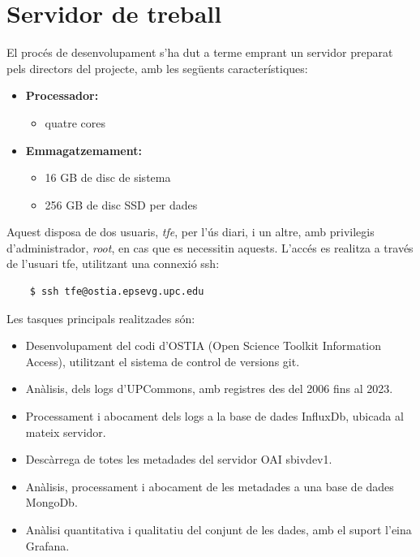 \chapter{Servidor de treball}\label{ch:server-description}

El procés de desenvolupament s’ha dut a terme emprant un servidor preparat pels directors del projecte, amb les següents característiques:

\begin{itemize}
    \item \textbf{Processador:}
    \begin{itemize}
        \item quatre cores
    \end{itemize}
    \item \textbf{Emmagatzemament:}
    \begin{itemize}
        \item 16 GB de disc de sistema
        \item 256 GB de disc SSD per dades
    \end{itemize}
\end{itemize}

\noindent
Aquest disposa de dos usuaris, \textit{tfe}, per l’ús diari, i un altre, amb privilegis d’administrador, \textit{root}, en cas que es necessitin aquests.
L’accés es realitza a través de l’usuari tfe, utilitzant una connexió ssh:

\begin{verbatim}
    $ ssh tfe@ostia.epsevg.upc.edu
\end{verbatim}

\noindent
Les tasques principals realitzades són:

\begin{itemize}
    \item Desenvolupament del codi d’OSTIA (Open Science Toolkit Information Access), utilitzant el sistema de control de versions git.
    \item Anàlisis, dels logs d’UPCommons, amb registres des del 2006 fins al 2023.
    \item Processament i abocament dels logs a la base de dades InfluxDb, ubicada al mateix servidor.
    \item Descàrrega de totes les metadades del servidor OAI sbivdev1.
    \item Anàlisis, processament i abocament de les metadades a una base de dades MongoDb.
    \item Anàlisi quantitativa i qualitatiu del conjunt de les dades, amb el suport l’eina Grafana.
\end{itemize}

